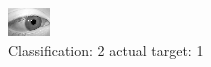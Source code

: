 \begin{figure}[h!]
\begin{center}
\includegraphics[width=0.60\columnwidth]{figures/ID2773_class_2_target_1.png}
\end{center}
\caption{ Classification: 2 actual target: 1}
\label{fig:ID2773_class_2_target_1}
\end{figure}
